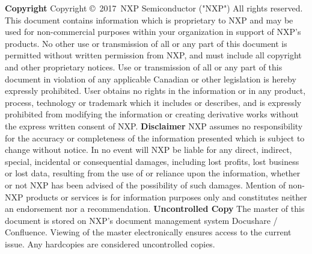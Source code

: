\documentclass[oneside]{book}
\newcommand{\copyrightYear}{2017}        %
\newcommand{\+}{\discretionary{\mbox{\scriptsize$\hookleftarrow$}}{}{}}
\begin{document}
\footnotesize
{ \setlength{\parindent}{0pt} \textbf{Copyright} }
\newline \newline
\vspace{4pt}
Copyright \copyright \ \copyrightYear \ NXP Semiconductor ("NXP") All rights reserved.
\newline
\scriptsize
This document contains information which is proprietary to NXP and may be used for non-commercial purposes within your organization in support of NXP's products.
No other use or transmission of all or any part of this document is permitted without written permission from NXP, and must include all copyright and other proprietary notices.
Use or transmission of all or any part of this document in violation of any applicable Canadian or other legislation is hereby expressly prohibited.
\vspace{4pt}
\newline
User obtains no rights in the information or in any product, process, technology or trademark which it includes or describes, and is expressly prohibited from modifying the information or creating derivative works without the express written consent of NXP.
\newline \newline \newline
{\footnotesize \textbf{Disclaimer}}
\vspace{5pt}
\newline
NXP assumes no responsibility for the accuracy or completeness of the information presented which is subject to change without notice.
In no event will NXP be liable for any direct, indirect, special, incidental or consequential damages, including lost profits, lost business or lost data, resulting from the use of or reliance upon the information, whether or not NXP has been advised of the possibility of such damages.
\vspace{3pt}
\newline
Mention of non-NXP products or services is for information purposes only and constitutes neither an endorsement nor a recommendation.
\newline \newline \newline
{\footnotesize \textbf{Uncontrolled Copy}}
\vspace{5pt}
\newline
The master of this document is stored on NXP's document management system Docushare / Confluence.  Viewing of the master electronically ensures access to the current issue. Any hardcopies are considered uncontrolled copies.
\newpage
\normalsize
\end{document}
